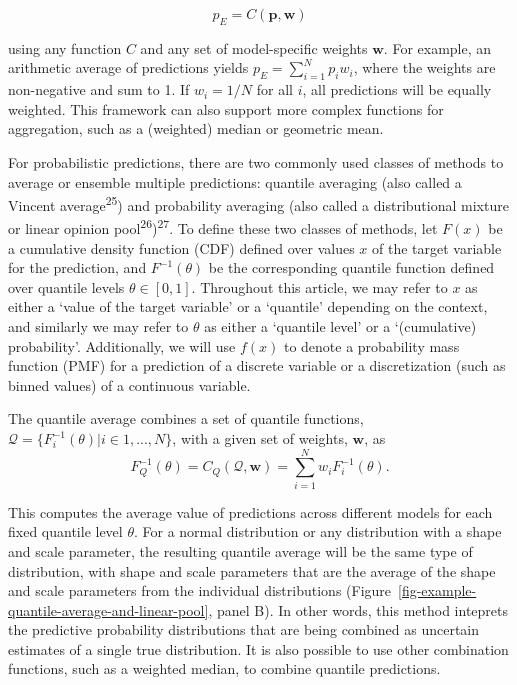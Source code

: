\documentclass[
  letterpaper,
  DIV=11,
  numbers=noendperiod]{scrartcl}
\begin{document}
\[
p_E = C(\pmb{p}, \pmb{w}) 
\]

using any function \(C\) and any set of model-specific weights
\(\pmb{w}\). For example, an arithmetic average of predictions yields
\(p_E = \sum_{i=1}^Np_iw_i\), where the weights are non-negative and sum
to 1. If \(w_i = 1/N\) for all \(i\), all predictions will be equally
weighted. This framework can also support more complex functions for
aggregation, such as a (weighted) median or geometric mean.

For probabilistic predictions, there are two commonly used classes of
methods to average or ensemble multiple predictions: quantile averaging
(also called a Vincent average\textsuperscript{25}) and probability
averaging (also called a distributional mixture or linear opinion
pool\textsuperscript{26})\textsuperscript{27}. To define these two
classes of methods, let \(F(x)\) be a cumulative density function (CDF)
defined over values \(x\) of the target variable for the prediction, and
\(F^{-1}(\theta)\) be the corresponding quantile function defined over
quantile levels \(\theta \in [0, 1]\). Throughout this article, we may
refer to \(x\) as either a `value of the target variable' or a
`quantile' depending on the context, and similarly we may refer to
\(\theta\) as either a `quantile level' or a `(cumulative) probability'.
Additionally, we will use \(f(x)\) to denote a probability mass function
(PMF) for a prediction of a discrete variable or a discretization (such
as binned values) of a continuous variable.

The quantile average combines a set of quantile functions,
\(\mathcal{Q} = \{F_i^{-1}(\theta)| i \in 1,...,N \}\), with a given set
of weights, \(\pmb{w}\), as \[
F^{-1}_Q(\theta) = C_Q(\mathcal{Q}, \pmb{w}) = \sum_{i = 1}^Nw_iF^{-1}_i(\theta).
\]

This computes the average value of predictions across different models
for each fixed quantile level \(\theta\). For a normal distribution or
any distribution with a shape and scale parameter, the resulting
quantile average will be the same type of distribution, with shape and
scale parameters that are the average of the shape and scale parameters
from the individual distributions
(Figure~\ref{fig-example-quantile-average-and-linear-pool}, panel B). In
other words, this method inteprets the predictive probability
distributions that are being combined as uncertain estimates of a single
true distribution. It is also possible to use other combination
functions, such as a weighted median, to combine quantile predictions.
\end{document}
